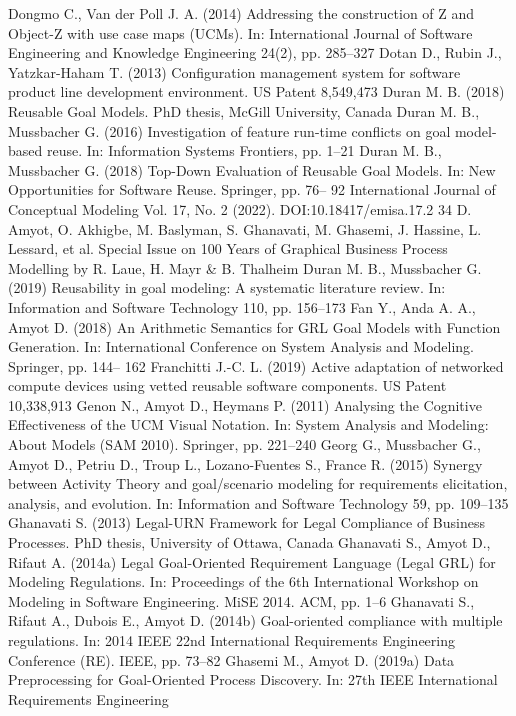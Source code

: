 Dongmo C., Van der Poll J. A. (2014) Addressing
the construction of Z and Object-Z with use case
maps (UCMs). In: International Journal of Software Engineering and Knowledge Engineering
24(2), pp. 285–327
Dotan D., Rubin J., Yatzkar-Haham T. (2013)
Configuration management system for software
product line development environment. US Patent
8,549,473
Duran M. B. (2018) Reusable Goal Models. PhD
thesis, McGill University, Canada
Duran M. B., Mussbacher G. (2016) Investigation
of feature run-time conflicts on goal model-based
reuse. In: Information Systems Frontiers, pp. 1–21
Duran M. B., Mussbacher G. (2018) Top-Down
Evaluation of Reusable Goal Models. In: New Opportunities for Software Reuse. Springer, pp. 76–
92
International Journal of Conceptual Modeling
Vol. 17, No. 2 (2022). DOI:10.18417/emisa.17.2
34 D. Amyot, O. Akhigbe, M. Baslyman, S. Ghanavati, M. Ghasemi, J. Hassine, L. Lessard, et al.
Special Issue on 100 Years of Graphical Business Process Modelling by R. Laue, H. Mayr & B. Thalheim
Duran M. B., Mussbacher G. (2019) Reusability
in goal modeling: A systematic literature review.
In: Information and Software Technology 110,
pp. 156–173
Fan Y., Anda A. A., Amyot D. (2018) An Arithmetic Semantics for GRL Goal Models with Function Generation. In: International Conference on
System Analysis and Modeling. Springer, pp. 144–
162
Franchitti J.-C. L. (2019) Active adaptation of
networked compute devices using vetted reusable
software components. US Patent 10,338,913
Genon N., Amyot D., Heymans P. (2011)
Analysing the Cognitive Effectiveness of the
UCM Visual Notation. In: System Analysis and
Modeling: About Models (SAM 2010). Springer,
pp. 221–240
Georg G., Mussbacher G., Amyot D., Petriu D.,
Troup L., Lozano-Fuentes S., France R. (2015)
Synergy between Activity Theory and goal/scenario modeling for requirements elicitation, analysis, and evolution. In: Information and Software
Technology 59, pp. 109–135
Ghanavati S. (2013) Legal-URN Framework for
Legal Compliance of Business Processes. PhD
thesis, University of Ottawa, Canada
Ghanavati S., Amyot D., Rifaut A. (2014a) Legal Goal-Oriented Requirement Language (Legal
GRL) for Modeling Regulations. In: Proceedings
of the 6th International Workshop on Modeling in
Software Engineering. MiSE 2014. ACM, pp. 1–6
Ghanavati S., Rifaut A., Dubois E., Amyot D.
(2014b) Goal-oriented compliance with multiple
regulations. In: 2014 IEEE 22nd International Requirements Engineering Conference (RE). IEEE,
pp. 73–82
Ghasemi M., Amyot D. (2019a) Data Preprocessing for Goal-Oriented Process Discovery. In: 27th
IEEE International Requirements Engineering
